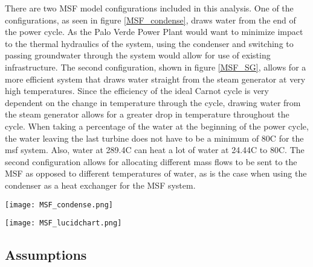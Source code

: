 There are two MSF model configurations included in this analysis.  One of the configurations, as seen in figure \ref{MSF_condense},  draws water from the end of the power cycle.  As the Palo Verde Power Plant would want to minimize impact to the thermal hydraulics of the system, using the condenser and switching to passing groundwater through the system would allow for use of existing infrastructure. The second configuration, shown in figure \ref{MSF_SG}, allows for a more efficient system that draws water straight from the steam generator at very high temperatures. Since the efficiency of the ideal Carnot cycle is very dependent on the change in temperature through the cycle, drawing water from the steam generator allows for a greater drop in temperature throughout the cycle.  When taking a percentage of the water at the beginning of the power cycle, the water leaving the last turbine does not have to be a minimum of 80\degree C for the \ac{msf} system.  Also, water at 289.4\degree C can heat a lot of water at 24.44\degree C to 80\degree C. The second configuration allows for allocating different mass flows to be sent to the MSF as opposed to different temperatures of water, as is the case when using the condenser as a heat exchanger for the MSF system.

\begin{figure*}[h!]
\centering
\texttt{[image: MSF\_condense.png]}
\caption{\small \sl This simplified drawing shows the main components of the power cycle including how the multistage flash distillation system is heated through the condenser}
 \label{MSF_condense}
\centering
\end{figure*}

\begin{figure*}[h!]
\centering
\texttt{[image: MSF\_lucidchart.png]}
\caption{\small \sl This simplified drawing shows the main components of the power cycle including how the multistage flash distillation system draws water just after the steam generator}
 \label{MSF_SG}
\centering
\end{figure*}
\clearpage

\subsection{Assumptions}

